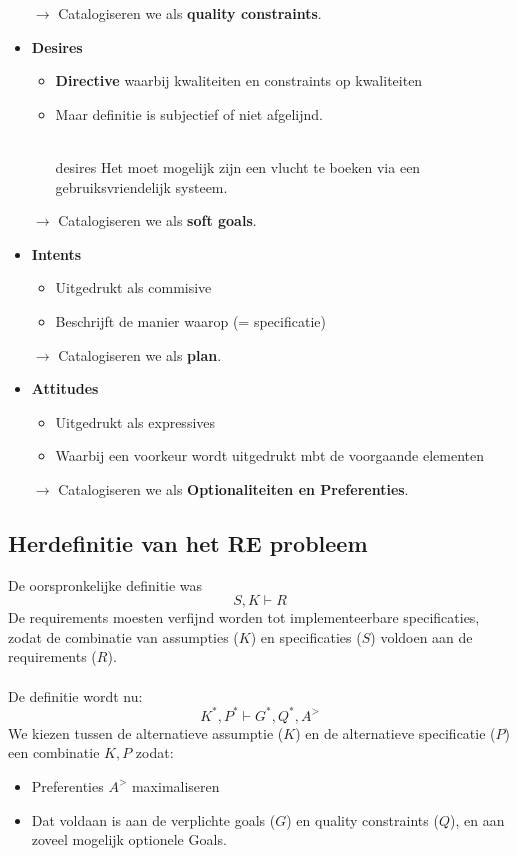 \documentclass[../../main.tex]{subfiles}
\begin{document}
\begin{itemize}
\begin{itemize}
	\end{itemize}
	$\rightarrow$ Catalogiseren we als \textbf{quality constraints}.
	\item \textbf{Desires}
	\begin{itemize}
		\item \textbf{Directive} waarbij  kwaliteiten en constraints op kwaliteiten
		\item Maar definitie is subjectief of niet afgelijnd.\\
		\\
		\begin{ex}{desires}
		Het moet mogelijk zijn een vlucht te boeken via een
gebruiksvriendelijk systeem.
		\end{ex}
	\end{itemize}
	$\rightarrow$ Catalogiseren we als \textbf{soft goals}.
	\item \textbf{Intents}
	\begin{itemize}
		\item Uitgedrukt als commisive\\
		\item Beschrijft de manier waarop (= specificatie)\\
	\end{itemize}
	$\rightarrow$ Catalogiseren we als \textbf{plan}.
	\item \textbf{Attitudes}
	\begin{itemize}
		\item Uitgedrukt als expressives
		\item Waarbij een voorkeur wordt uitgedrukt mbt de
voorgaande elementen
	\end{itemize}
	$\rightarrow$ Catalogiseren we als \textbf{Optionaliteiten en Preferenties}.
\end{itemize}

\subsection{Herdefinitie van het RE probleem}
De oorspronkelijke definitie was
\begin{equation*}
\boxed{S,K \vdash R}
\end{equation*}
De requirements moesten verfijnd worden tot implementeerbare specificaties, zodat de combinatie van assumpties ($K$) en specificaties ($S$) voldoen aan de requirements ($R$).\\
\\
De definitie wordt nu:
\begin{equation*}
\boxed{K^*,P^* \vdash G^*,Q^*,A^{>}}
\end{equation*}
We kiezen tussen de alternatieve assumptie ($K$) en de alternatieve specificatie ($P$) een combinatie $K,P$ zodat:
\begin{itemize}
	\item Preferenties $A^{>}$ maximaliseren
	\item Dat voldaan is aan de verplichte goals ($G$) en quality constraints ($Q$), en aan zoveel mogelijk optionele Goals.
\end{itemize}
\end{document}

